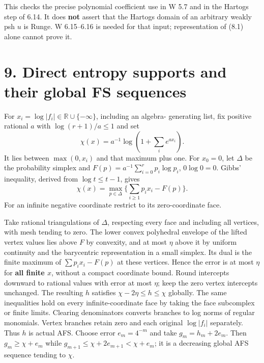 \documentclass[
  10pt,
]{article}
\begin{document}
This checks the precise polynomial coefficient use in W 5.7 and in the
Hartogs step of 6.14. It does \textbf{not} assert that the Hartogs
domain of an arbitrary weakly psh \(u\) is Runge. W 6.15--6.16 is needed
for that input; representation of (8.1) alone cannot prove it.

\section{9. Direct entropy supports and their global FS
sequences}\label{direct-entropy-supports-and-their-global-fs-sequences}

For \(x_i=\log|f_i|\in\mathbb R\cup\{-\infty\}\), including an algebra-
generating list, fix positive rational \(a\) with \(\log(r+1)/a\le1\)
and set \[\chi(x)=a^{-1}\log(1+\sum_i e^{ax_i}).\] It lies between
\(\max(0,x_i)\) and that maximum plus one. For \(x_0=0\), let \(\Delta\)
be the probability simplex and \(F(p)=a^{-1}\sum_{i=0}^r p_i\log p_i\),
\(0\log0=0\). Gibbs' inequality, derived from \(\log t\le t-1\), gives
\[\chi(x)=\max_{p\in\Delta}\{\sum_{i\ge1}p_ix_i-F(p)\}.\] For an
infinite negative coordinate restrict to its zero-coordinate face.

Take rational triangulations of \(\Delta\), respecting every face and
including all vertices, with mesh tending to zero. The lower convex
polyhedral envelope of the lifted vertex values lies above \(F\) by
convexity, and at most \(\eta\) above it by uniform continuity and the
barycentric representation in a small simplex. Its dual is the finite
maximum of \(\sum p_ix_i-F(p)\) at these vertices. Hence the error is at
most \(\eta\) for \textbf{all finite \(x\)}, without a compact
coordinate bound. Round intercepts downward to rational values with
error at most \(\eta\); keep the zero vertex intercepts unchanged. The
resulting \(h\) satisfies \(\chi-2\eta\le h\le\chi\) globally. The same
inequalities hold on every infinite-coordinate face by taking the face
subcomplex or finite limits. Clearing denominators converts branches to
log norms of regular monomials. Vertex branches retain zero and each
original \(\log|f_i|\) separately. Thus \(h\) is actual AFS. Choose
error \(e_m=4^{-m}\) and take \(g_m=h_m+2e_m\). Then \(g_m\ge\chi+e_m\)
while \(g_{m+1}\le\chi+2e_{m+1}<\chi+e_m\); it is a decreasing global
AFS sequence tending to \(\chi\).
\end{document}
